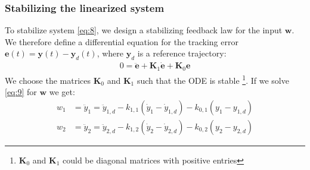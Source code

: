 \documentclass[a4paper,11pt,headings=standardclasses]{scrartcl}%
\newcommand{\y}{\mathbf{y}}
\begin{document}
\subsubsection{Stabilizing the linearized system}
To stabilize system \eqref{eq:8}, we design a stabilizing feedback law for the input $\mathbf{w}$. We therefore define a differential equation for the tracking error $\mathbf{e}(t)=\y(t)-\y_d(t)$, where $\y_d$ is a reference trajectory:
\begin{align}
\label{eq:9}
0 = \ddot{\mathbf{e}} + \mathbf{K}_1 \dot{\mathbf{e}}+\mathbf{K}_0 \mathbf{e}
\end{align}
We choose the matrices $\mathbf{K}_0$ and $\mathbf{K}_1$ such that the ODE is stable \footnote{$\mathbf{K}_0$ and $\mathbf{K}_1$ could be diagonal matrices with positive entries}.
If we solve \eqref{eq:9} for $\mathbf{w}$ we get:
\begin{subequations}
\label{eq:10}
\begin{align}
w_1 &= \ddot{y}_1 = \ddot{y}_{1,d} - k_{1,1}(\dot{y}_1-\dot{y}_{1,d})-k_{0,1}(y_1-y_{1,d}) \\
w_2 &= \ddot{y}_2 = \ddot{y}_{2,d} - k_{1,2}(\dot{y}_2-\dot{y}_{2,d})-k_{0,2}(y_2-y_{2,d})
\end{align}
\end{subequations}
\end{document}
